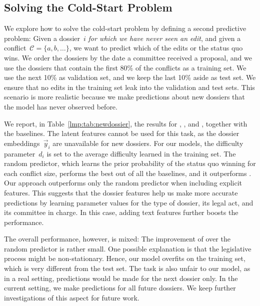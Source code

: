 \subsection{Solving the Cold-Start Problem}
\label{lmp:sec:cold-start}

We explore how to solve the cold-start problem by defining a second predictive problem:
Given a dossier~$i$ \textit{for which we have never seen an edit}, and given a conflict~$\mathcal{C} = \{a, b, \ldots \}$, we want to predict which of the edits or the status quo wins.
We order the dossiers by the date a committee received a proposal, and we use the dossiers that contain the first 80\% of the conflicts as a training set.
We use the next 10\% as validation set, and we keep the last 10\% aside as test set.
We ensure that no edits in the training set leak into the validation and test sets.
This scenario is more realistic because we make predictions about new dossiers that the model has never observed before.

We report, in Table~\ref{lmp:tab:newdossier}, the results for , , and , together with the baselines.
The latent features cannot be used for this task, as the dossier embeddings~$\vec{y}_i$ are unavailable for new dossiers.
For our models, the difficulty parameter~$d_i$ is set to the average difficulty learned in the training set.
The random predictor, which learns the prior probability of the status quo winning for each conflict size, performs the best out of all the baselines, and it outperforms .
Our approach outperforms only the random predictor when including explicit features.
This suggests that the dossier features help us make more accurate predictions by learning parameter values for the type of dossier, its legal act, and its committee in charge.
In this case, adding text features further boosts the performance.

The overall performance, however, is mixed:
The improvement of  over the random predictor is rather small.
One possible explanation is that the legislative process might be non-stationary.
Hence, our model overfits on the training set, which is very different from the test set.
The task is also unfair to our model, as in a real setting, predictions would be made for the next dossier only.
In the current setting, we make predictions for all future dossiers.
We keep further investigations of this aspect for future work.

